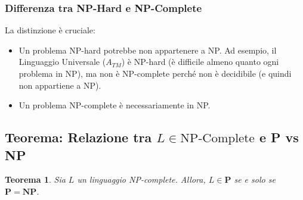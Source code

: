 \documentclass[a4paper, 11pt]{book} %
\newtheorem{theorem}{Teorema}[section]
\theoremstyle{definition}
\begin{document}
\subsubsection{Differenza tra NP-Hard e NP-Complete}
La distinzione è cruciale:
\begin{itemize}
    \item Un problema NP-hard potrebbe non appartenere a NP. Ad esempio, il Linguaggio Universale ($A_{TM}$) è NP-hard (è difficile almeno quanto ogni problema in NP), ma non è NP-complete perché non è decidibile (e quindi non appartiene a NP).
    \item Un problema NP-complete è necessariamente in NP.
\end{itemize}

\subsection{Teorema: Relazione tra $L \in \text{NP-Complete}$ e P vs NP}

\begin{theorem}
Sia $L$ un linguaggio NP-complete. Allora, $L \in \mathbf{P}$ se e solo se $\mathbf{P} = \mathbf{NP}$.
\end{theorem}
\end{document}
